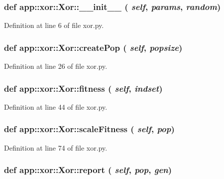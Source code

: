 \subsubsection{\setlength{\rightskip}{0pt plus 5cm}def app::xor::Xor::\_\-\_\-init\_\-\_\- ( {\em self},  {\em params},  {\em random})}\label{classapp_1_1xor_1_1Xor_79de0815bdb6b968c1357e7fdd926b24}




Definition at line 6 of file xor.py.
\subsubsection{\setlength{\rightskip}{0pt plus 5cm}def app::xor::Xor::createPop ( {\em self},  {\em popsize})}\label{classapp_1_1xor_1_1Xor_848b0d52ca55d1b7e42684d459740318}




Definition at line 26 of file xor.py.
\subsubsection{\setlength{\rightskip}{0pt plus 5cm}def app::xor::Xor::fitness ( {\em self},  {\em indset})}\label{classapp_1_1xor_1_1Xor_09ed3e4a28e28ccaf816e02da2806306}




Definition at line 44 of file xor.py.
\subsubsection{\setlength{\rightskip}{0pt plus 5cm}def app::xor::Xor::scaleFitness ( {\em self},  {\em pop})}\label{classapp_1_1xor_1_1Xor_ff6baf5f2d25192db6f202ef0aeb5bab}




Definition at line 74 of file xor.py.
\subsubsection{\setlength{\rightskip}{0pt plus 5cm}def app::xor::Xor::report ( {\em self},  {\em pop},  {\em gen})}\label{classapp_1_1xor_1_1Xor_399d5dc1f6537ca73d79427290dd2ad6}




